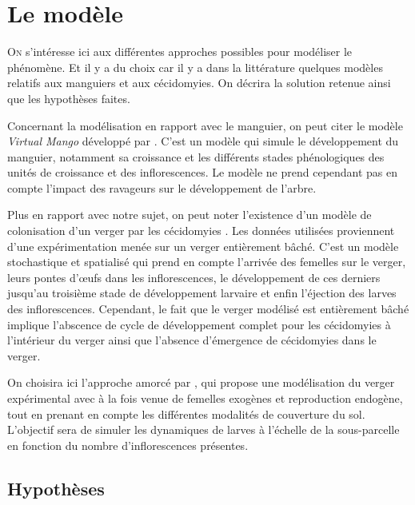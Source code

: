 \chapter{Le modèle}

\lettrine{O}{n} s'intéresse ici aux différentes approches possibles pour modéliser le phénomène. 
Et il y a du choix car il y a dans la littérature quelques modèles relatifs aux manguiers et aux cécidomyies.
On décrira la solution retenue ainsi que les hypothèses faites.

Concernant la modélisation en rapport avec le manguier, on peut citer le modèle \emph{Virtual Mango} développé par \citet{fred}.
C'est un modèle qui simule le développement du manguier, notamment sa croissance et les différents stades phénologiques des unités de croissance et des inflorescences.
Le modèle ne prend cependant pas en compte l'impact des ravageurs sur le développement de l'arbre.

Plus en rapport avec notre sujet, on peut noter l'existence d'un modèle de colonisation d'un verger par les cécidomyies \citep{paul}. 
Les données utilisées proviennent d'une expérimentation menée sur un verger entièrement bâché. 
C'est un modèle stochastique et spatialisé qui prend en compte l'arrivée des femelles sur le verger, leurs pontes d'œufs dans les inflorescences, le développement de ces derniers jusqu'au troisième stade de développement larvaire et enfin l'éjection des larves des inflorescences.
Cependant, le fait que le verger modélisé est entièrement bâché implique l'abscence de cycle de développement complet pour les cécidomyies à l'intérieur du verger ainsi que l'absence d'émergence de cécidomyies dans le verger.

On choisira ici l'approche amorcé par \citet{laurie}, qui propose une modélisation du verger expérimental avec à la fois venue de femelles exogènes et reproduction endogène, tout en prenant en compte les différentes modalités de couverture du sol.
L'objectif sera de simuler les dynamiques de larves à l'échelle de la sous-parcelle en fonction du nombre d'inflorescences présentes.




\section{Hypothèses}

